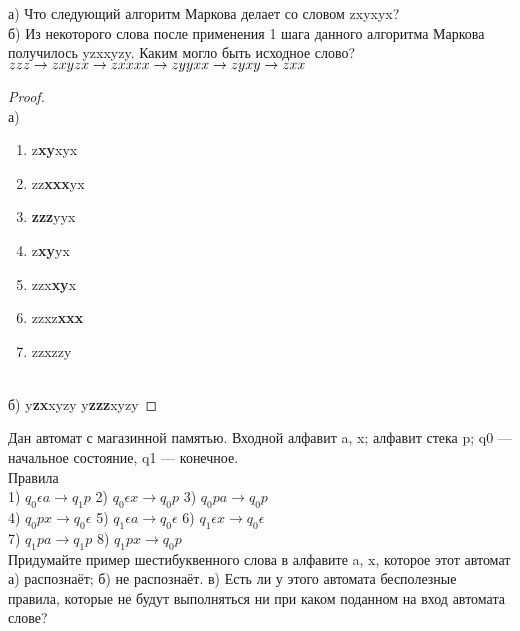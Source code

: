 \begin{problem}
    а) Что следующий алгоритм Маркова делает со словом zxyxyx? \\
    б) Из некоторого слова после применения 1 шага данного алгоритма Маркова получилось yzxxyzy. Каким могло быть исходное слово? \\
    $zzz \rightarrow zx \\
     yzx \rightarrow zx \\
     xxx \rightarrow zy \\
     yxx \rightarrow zy \\ 
     xy \rightarrow zxx$
\end{problem}

\begin{proof} $ $\\
    а) \begin{enumerate}
        \item z\textbf{xy}xyx
        \item zz\textbf{xxx}yx
        \item\textbf{zzz}yyx 
        \item z\textbf{xy}yx
        \item zzx\textbf{xy}x
        \item zzxz\textbf{xxx}
        \item zzxzzy
    \end{enumerate} \\
    б) y\textbf{zx}xyzy \leftarrow y\textbf{zzz}xyzy
\end{proof}

\begin{problem}
    Дан автомат с магазинной памятью. Входной алфавит {a, x}; алфавит стека {p}; q0 — начальное состояние, q1 — конечное.\\
    Правила\\
    1) $q_0 \epsilon a \rightarrow q_1 p$  2) $q_0 \epsilon x \rightarrow q_0 p$  3) $q_0 pa \rightarrow q_0 p$\\
    4) $q_0 px \rightarrow q_0 \epsilon$  5) $q_1 \epsilon a \rightarrow q_0 \epsilon$  6) $q_1 \epsilon x \rightarrow q_0 \epsilon$\\
    7) $q_1 pa \rightarrow q_1 p$  8) $q_1 px \rightarrow q_0 p$\\
    Придумайте пример шестибуквенного слова в алфавите {a, x}, которое этот автомат а) распознаёт; б) не распознаёт. в) Есть ли у этого автомата бесполезные правила, которые не будут выполняться ни при каком поданном на вход автомата слове?

\end{problem}


